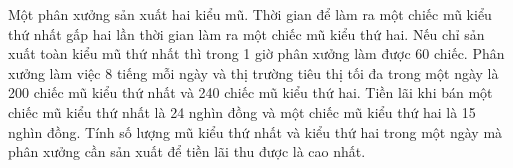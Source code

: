\begin{bt}%
			Một phân xưởng sản xuất hai kiểu mũ. Thời gian để làm ra một chiếc mũ kiểu thứ nhất gấp hai lần thời gian làm ra một chiếc mũ kiểu thứ hai. Nếu chỉ sản xuất toàn kiểu mũ thứ nhất thì trong 1 giờ phân xưởng làm được $60$ chiếc. Phân xưởng làm việc 8 tiếng mỗi ngày và thị trường tiêu thị tối đa trong một ngày là 200 chiếc mũ kiểu thứ nhất và 240 chiếc mũ kiểu thứ hai. Tiền lãi khi bán một chiếc mũ kiểu thứ nhất là 24 nghìn đồng và một chiếc mũ kiểu thứ hai là 15 nghìn đồng. Tính số lượng mũ kiểu thứ nhất và kiểu thứ hai trong một ngày mà phân xưởng cần sản xuất để tiền lãi thu được là cao nhất.
		\end{bt}

